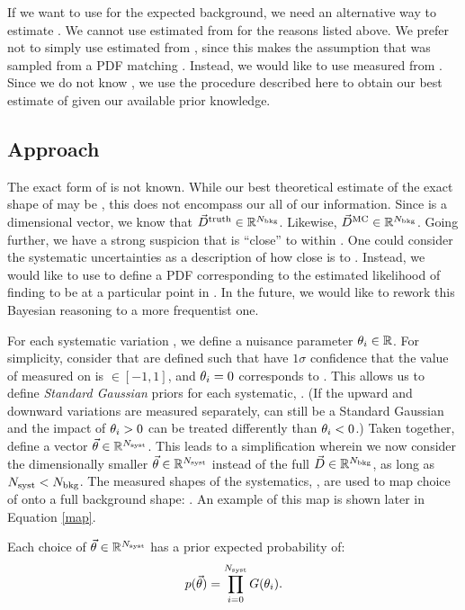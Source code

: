 If we want to use \nbkgdata for the expected background, we need an alternative way to estimate \spur.
We cannot use \spur estimated from \nbkgdata for the reasons listed above.
We prefer not to simply use \spur estimated from \nbkgmc, since this makes the assumption that \mc was sampled from a PDF matching \truth.
Instead, we would like to use \spur measured from \nbkgtruth.
Since we do not know \truthdata, we use the procedure described here to obtain our best estimate of \truthdata given our available prior knowledge.

\subsection*{Approach}

The exact form of \truthdata is not known. While our best theoretical estimate of the exact shape of \truthdata may be \mc, this does not encompass our all of our information. Since \truthdata is a \dbkg dimensional vector, we know that $\vec{D}^\mathrm{truth}\in\mathbb{R}^{N_\mathrm{bkg}}$. Likewise, $\vec{D}^\mathrm{MC}\in\mathbb{R}^{N_\mathrm{bkg}}$. Going further, we have a strong suspicion that \truthdata is ``close'' to \mc within \realsBkg. One could consider the systematic uncertainties \syst as a description of how close \truthdata is to \mc. Instead, we would like to use \syst to define a PDF \map corresponding to the estimated likelihood of finding \truthdata to be at a particular point in \realsBkg. In the future, we would like to rework this Bayesian reasoning to a more frequentist one.

For each systematic variation \syst, we define a nuisance parameter $\theta_i\in\mathbb{R}$. For simplicity, consider that \np are defined such that have $1\sigma$ confidence that the value of \npmeasured measured on \truthdata is $\in[-1,1]$, and $\theta_i=0$ corresponds to \mc. This allows us to define \emph{Standard Gaussian} priors for each systematic, \npprob. (If the upward and downward variations are measured separately, \npprob can still be a Standard Gaussian and the impact of $\theta_i>0$ can be treated differently than $\theta_i<0$.) Taken together, \np define a vector $\vec{\theta}\in\mathbb{R}^{N_\mathrm{syst}}$. This leads to a simplification wherein we now consider the dimensionally smaller $\vec{\theta}\in\mathbb{R}^{N_\mathrm{syst}}$ instead of the full $\vec{D}\in\mathbb{R}^{N_\mathrm{bkg}}$, as long as $N_\mathrm{syst}<N_\mathrm{bkg}$. The measured shapes of the systematics, \systs, are used to map choice of \nps onto a full background shape: \mapThetaToBkg. An example of this map is shown later in Equation \ref{map}.

Each choice of $\vec{\theta}\in\mathbb{R}^{N_\mathrm{syst}}$ has a prior expected probability of:
\begin{equation}\label{thetaProb}
p(\vec{\theta}) = \prod_{i=0}^{N_\mathrm{syst}}G(\theta_i).
\end{equation}

